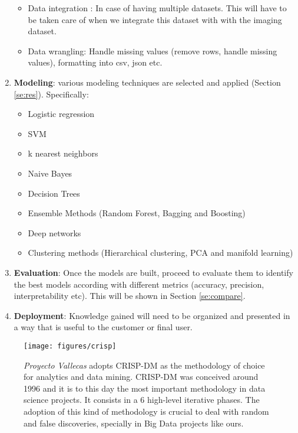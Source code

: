 \documentclass[11pt]{article}
\theoremstyle{definition}
\theoremstyle{remark}
\begin{document}
\begin{enumerate}
\begin{itemize}
		\item Data integration : In case of having multiple datasets. This will have to be taken care of when we integrate this dataset with with the imaging dataset.
		\item Data wrangling: Handle missing values (remove rows, handle missing values), formatting into csv, json etc.
	\end{itemize}
\item \textbf{Modeling}: various modeling techniques are selected and applied (Section \ref{se:res}). Specifically:
	\begin{itemize}
		\item Logistic regression
		\item SVM
		\item k nearest neighbors
		\item Naive Bayes
		\item Decision Trees
		\item Ensemble Methods (Random Forest, Bagging and Boosting)
		\item Deep networks
		\item Clustering methods (Hierarchical clustering, PCA and manifold learning)
	\end{itemize}
\item \textbf{Evaluation}: Once the models are built, proceed to evaluate them to identify the best models according with different metrics (accuracy, precision, interpretability etc). This will be shown in Section \ref{se:compare}.
\item \textbf{Deployment}: Knowledge gained will need to be organized and presented in a way that is useful to the customer or final user.
\end{enumerate}

\begin{figure}[H]
        \centering
        \texttt{[image: figures/crisp]}
        \caption{\emph{Proyecto Vallecas} adopts CRISP-DM \cite{crispdmwiki} as the methodology of choice for analytics and data mining. CRISP-DM was conceived around 1996 and it is to this day the most important methodology in data science projects. It consists in a 6 high-level iterative phases. The adoption of this kind of methodology is crucial to deal with random and false discoveries, specially in Big Data projects like ours.}\label{fig:crisp}
\end{figure}
\end{document}
